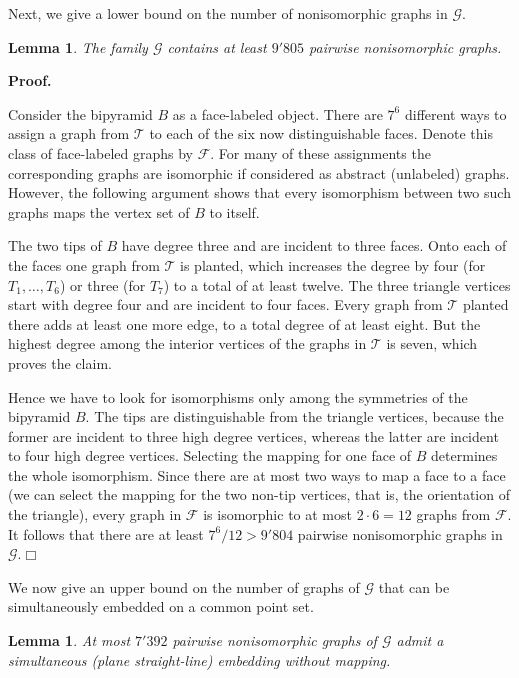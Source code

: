 \documentclass[11pt]{article}
\newtheorem{lemma}[equation]{Lemma}
\newcommand{\qed}{\hfill\ensuremath{\Box}}
\newenvironment{proof}{\noindent\textbf{Proof.}
}{\par\medskip}
\begin{document}
Next, we give a lower bound on the number of nonisomorphic graphs in
$\mathcal{G}$.
\begin{lemma}
  The family $\mathcal{G}$ contains at least $9'805$ pairwise nonisomorphic
  graphs.
\end{lemma}
\begin{proof}
  Consider the bipyramid $B$ as a face-labeled object. There are $7^6$ different
  ways to assign a graph from $\mathcal{T}$ to each of the six now
  distinguishable faces. Denote this class of face-labeled graphs by
  $\mathcal{F}$. For many of these assignments the corresponding graphs are
  isomorphic if considered as abstract (unlabeled) graphs. However, the
  following argument shows that every isomorphism between two such graphs maps
  the vertex set of $B$ to itself.

  The two tips of $B$ have degree three and are incident to three faces. Onto
  each of the faces one graph from $\mathcal{T}$ is planted, which increases the
  degree by four (for $T_1,\ldots,T_6$) or three (for $T_7$) to a total of at
  least twelve. The three triangle vertices start with degree four and are
  incident to four faces. Every graph from $\mathcal{T}$ planted there adds at
  least one more edge, to a total degree of at least eight. But the highest
  degree among the interior vertices of the graphs in $\mathcal{T}$ is seven,
  which proves the claim.

  Hence we have to look for isomorphisms only among the symmetries of the
  bipyramid $B$. The tips are distinguishable from the triangle vertices,
  because the former are incident to three high degree vertices, whereas the
  latter are incident to four high degree vertices. Selecting the mapping for
  one face of $B$ determines the whole isomorphism. Since there are at most two
  ways to map a face to a face (we can select the mapping for the two non-tip
  vertices, that is, the orientation of the triangle), every graph in
  $\mathcal{F}$ is isomorphic to at most $2\cdot 6=12$ graphs from
  $\mathcal{F}$. It follows that there are at least $7^6/12>9'804$ pairwise
  nonisomorphic graphs in $\mathcal{G}$.\qed
\end{proof}
We now give an upper bound on the number of graphs of $\mathcal{G}$ that can be
simultaneously embedded on a common point set.
\begin{lemma}
  At most $7'392$ pairwise nonisomorphic graphs of $\mathcal{G}$ admit a
  simultaneous (plane straight-line) embedding without mapping.
\end{lemma}
\end{document}
